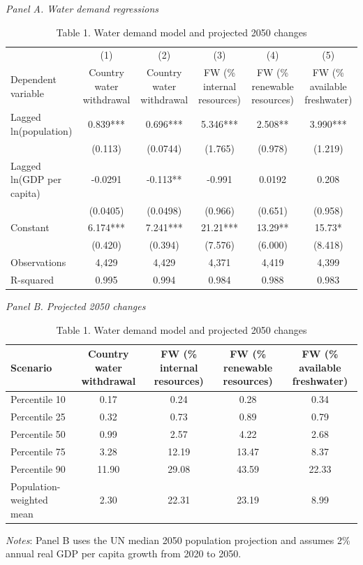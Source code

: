\begin{table}[htbp]
\centering
\caption{Table 1. Water demand model and projected 2050 changes}
\small
\textit{Panel A. Water demand regressions}\\
\begin{tabular}{lccccc}
\hline
 & (1) & (2) & (3) & (4) & (5) \\
Dependent variable & Country water withdrawal & Country water withdrawal & FW (\% internal resources) & FW (\% renewable resources) & FW (\% available freshwater) \\
\hline
Lagged ln(population) & 0.839*** & 0.696*** & 5.346*** & 2.508** & 3.990*** \\
 & (0.113) & (0.0744) & (1.765) & (0.978) & (1.219) \\
Lagged ln(GDP per capita) & -0.0291 & -0.113** & -0.991 & 0.0192 & 0.208 \\
 & (0.0405) & (0.0498) & (0.966) & (0.651) & (0.958) \\
Constant & 6.174*** & 7.241*** & 21.21*** & 13.29** & 15.73* \\
 & (0.420) & (0.394) & (7.576) & (6.000) & (8.418) \\
\hline
Observations & 4,429 & 4,429 & 4,371 & 4,419 & 4,399 \\
R-squared & 0.995 & 0.994 & 0.984 & 0.988 & 0.983 \\
\hline
\end{tabular}
\vspace{0.75em}
\textit{Panel B. Projected 2050 changes}\\
\begin{tabular}{lcccc}
\hline
Scenario & Country water withdrawal & FW (\% internal resources) & FW (\% renewable resources) & FW (\% available freshwater) \\
\hline
Percentile 10 & 0.17 & 0.24 & 0.28 & 0.34 \\
Percentile 25 & 0.32 & 0.73 & 0.89 & 0.79 \\
Percentile 50 & 0.99 & 2.57 & 4.22 & 2.68 \\
Percentile 75 & 3.28 & 12.19 & 13.47 & 8.37 \\
Percentile 90 & 11.90 & 29.08 & 43.59 & 22.33 \\
Population-weighted mean & 2.30 & 22.31 & 23.19 & 8.99 \\
\hline
\end{tabular}
\vspace{0.5em}
\parbox{0.95\textwidth}{\footnotesize \textit{Notes}: Panel B uses the UN median 2050 population projection and assumes 2\% annual real GDP per capita growth from 2020 to 2050.}
\end{table}
